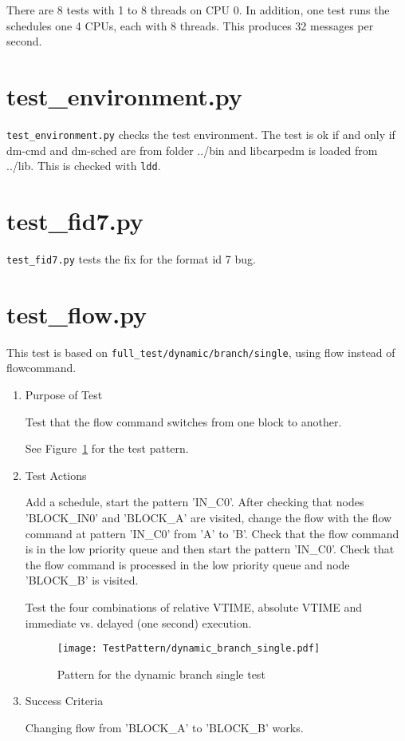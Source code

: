 \documentclass[12pt,a4paper]{report}
\begin{document}
There are 8 tests with 1 to 8 threads on CPU 0. In addition, one test runs the schedules one 4 CPUs, each with 8 threads. This
produces 32 messages per second.

\section{test\_environment.py}
\texttt{test\_environment.py} checks the test environment. The test is ok if and only if dm-cmd and dm-sched are
from folder ../bin and libcarpedm is loaded from ../lib. This is checked with \texttt{ldd}.

\section{test\_fid7.py}
\texttt{test\_fid7.py} tests the fix for the format id 7 bug.

\section{test\_flow.py}
This test is based on \texttt{full\_test/dynamic/branch/single}, using flow instead of flowcommand.
\begin{enumerate}
	\item Purpose of Test

	Test that the flow command switches from one block to another.

	See Figure~\ref{fig:Pattern_for_the_dynamic_branch_single_test} for the test pattern.
	\item Test Actions

	Add a schedule, start the pattern 'IN\_C0'. After checking that nodes 'BLOCK\_IN0' and 'BLOCK\_A' are visited,
        change the flow with the flow command at pattern 'IN\_C0' from 'A' to 'B'. Check that the flow
        command is in the low priority queue and then start the pattern 'IN\_C0'. Check that the flow
        command is processed in the low priority queue and node 'BLOCK\_B' is visited.

  Test the four combinations of relative VTIME, absolute VTIME and immediate vs. delayed (one second) execution.
    \begin{figure}
        \centering
        \texttt{[image: TestPattern/dynamic\_branch\_single.pdf]}
        \caption{Pattern for the dynamic branch single test}
        \label{fig:Pattern_for_the_dynamic_branch_single_test}
    \end{figure}
	\item Success Criteria

	Changing flow from 'BLOCK\_A' to 'BLOCK\_B' works.
\end{enumerate}
\end{document}
